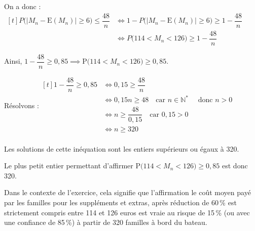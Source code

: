 \documentclass[10pt]{article}
\providecommand{\N}{\mathbb{N}}
\begin{document}
\begin{enumerate}
\begin{enumerate}
			On a donc :\quad $\begin{aligned}[t]
				P\big(\big|M_n - \mathrm{E}(M_n)\big| \geqslant 6\big) \leqslant \dfrac{48}{n}
					&\iff 1 - P\big(\big|M_n - \mathrm{E}(M_n)\big| \geqslant 6\big) \geqslant 1 - \dfrac{48}{n} \\
					&\iff P\big(114 < M_n < 126\big) \geqslant 1 - \dfrac{48}{n}
			\end{aligned}$

			Ainsi, \quad $1 - \dfrac{48}{n} \geqslant 0,85 \implies \mathrm{P}\big(114<M_{n}<126\big) \geqslant 0,85$.

			Résolvons :\quad $ \begin{aligned}[t]
				1 - \dfrac{48}{n} \geqslant 0,85
					&\iff 0,15 \geqslant \dfrac{48}{n}\\
					&\iff 0,15 n \geqslant 48\quad \text{car } n \in \N^{*} \quad\text{ donc } n>0\\
					&\iff n \geqslant \dfrac{48}{0,15}\quad \text{car } 0,15>0\\
					&\iff n \geqslant 320\\
			\end{aligned}$

			Les solutions de cette inéquation sont les entiers supérieurs ou égaux à 320.

			Le plus petit entier permettant d'affirmer $\mathrm{P}\big(114<M_{n}<126\big) \geqslant 0,85$ est donc 320.

			Dans le contexte de l'exercice, cela signifie que l'affirmation \og le coût moyen payé par les familles pour les suppléments et extras, après réduction de 60\,\% est strictement compris entre 114 et 126 euros\fg{} est vraie au risque de 15\,\% (ou avec une confiance de 85\,\%) à partir de 320 familles à bord du bateau.

		\end{enumerate}
	\end{enumerate}
\end{document}

